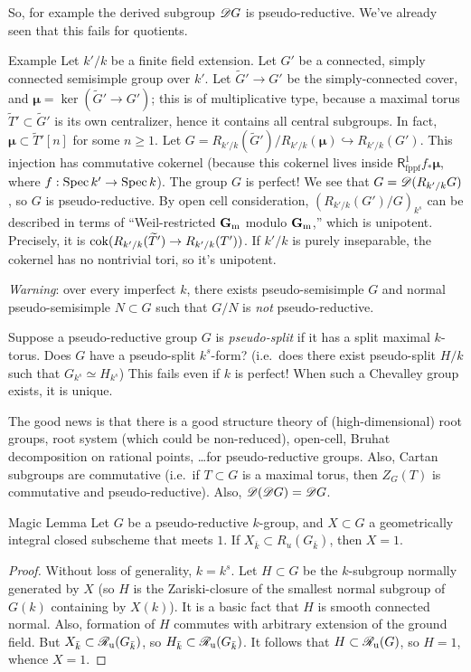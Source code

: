 So, for example the derived subgroup $\mathscr{D} G$ is pseudo-reductive. We've already 
seen that this fails for quotients. 

\begin{enonce}[remark]{Example}
Let $k'/k$ be a finite field extension. Let $G'$ be a connected, simply connected 
semisimple group over $k'$. Let $\widetilde G' \to G'$ be the simply-connected 
cover, and $\boldsymbol\mu=\ker(\widetilde G' \to G')$; this is of multiplicative 
type, because a maximal torus $\widetilde T'\subset \widetilde G'$ is its own 
centralizer, hence it contains all central subgroups. In fact, 
$\boldsymbol\mu\subset \widetilde T'[n]$ for some $n\geqslant 1$. Let 
$G=R_{k'/k}(\widetilde G')/R_{k'/k}(\boldsymbol\mu)\hookrightarrow R_{k'/k}(G')$. 
This injection has commutative cokernel (because this cokernel lives inside 
$\mathsf R_\mathrm{fppf}^1 f_\ast \boldsymbol\mu$, where 
$f:\operatorname{Spec} k' \to \operatorname{Spec} k$). The group $G$ is perfect! We see that 
$G=\mathscr{D}(R_{k'/k} G)$, so $G$ is pseudo-reductive. By open cell consideration, 
$(R_{k'/k}(G')/G)_{k^s}$ can be described in terms of ``Weil-restricted $\mathbf{G}_{\mathrm{m}}$ 
modulo $\mathbf{G}_{\mathrm{m}}$,'' which is unipotent. Precisely, it is 
$\operatorname{cok}(R_{k'/k}(\widetilde T') \to R_{k'/k}(T'))$. If $k'/k$ is purely 
inseparable, the cokernel has no nontrivial tori, so it's unipotent. 
\end{enonce}

\emph{Warning}: over every imperfect $k$, there exists pseudo-semisimple $G$ 
and normal pseudo-semisimple $N\subset G$ such that $G/N$ is \emph{not} 
pseudo-reductive. 

Suppose a pseudo-reductive group $G$ is \emph{pseudo-split} if it has a split 
maximal $k$-torus. Does $G$ have a pseudo-split $k^s$-form? (i.e.\ does there 
exist pseudo-split $H/k$ such that $G_{k^s}\simeq H_{k^s}$) This fails even 
if $k$ is perfect! When such a Chevalley group exists, it is unique. 

The good news is that there is a good structure theory of (high-dimensional) 
root groups, root system (which could be non-reduced), open-cell, Bruhat 
decomposition on rational points, \ldots for pseudo-reductive groups. Also, 
Cartan subgroups are commutative (i.e.\ if $T\subset G$ is a maximal torus, 
then $Z_G(T)$ is commutative and pseudo-reductive). Also, 
$\mathscr{D}(\mathscr{D} G)=\mathscr{D} G$. 

\begin{enonce}{Magic Lemma}
Let $G$ be a pseudo-reductive $k$-group, and $X\subset G$ a geometrically 
integral closed subscheme that meets $1$. If $X_{\bar k}\subset R_u(G_{\bar k})$, 
then $X=1$. 
\end{enonce}
\begin{proof}
Without loss of generality, $k=k^s$. Let $H\subset G$ be the $k$-subgroup 
normally generated by $X$ (so $H$ is the Zariski-closure of the smallest normal 
subgroup of $G(k)$ containing by $X(k)$). It is a basic fact that $H$ is 
smooth connected normal. Also, formation of $H$ commutes with arbitrary 
extension of the ground field. But $X_{\bar k}\subset \mathscr{R}_{\mathrm{u}}(G_{\bar k})$, so 
$H_{\bar k}\subset \mathscr{R}_{\mathrm{u}}(G_{\bar k})$. It follows that $H\subset \mathscr{R}_{\mathrm{u}}(G)$, so 
$H=1$, whence $X=1$. 
\end{proof}

